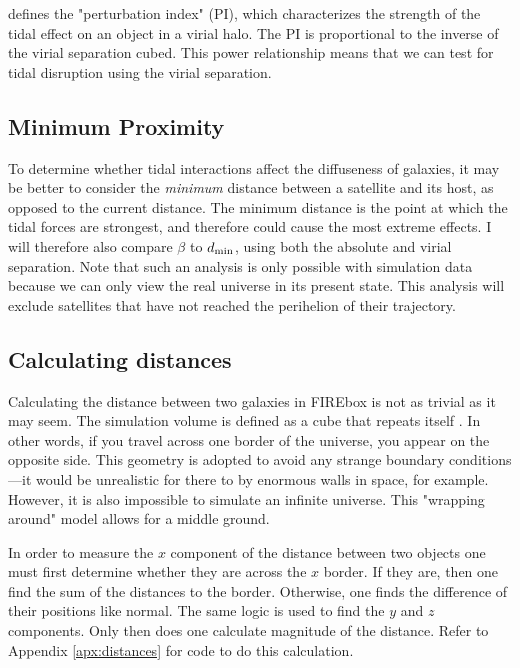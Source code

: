 \cite{jacksonDarkmatterdeficientDwarfGalaxies2021} defines the "perturbation index" (PI), which characterizes the strength of the tidal effect on an object in a virial halo. The PI is proportional to the inverse of the virial separation cubed. This power relationship means that we can test for tidal disruption using the virial separation.

 \subsection{Minimum Proximity}

 To determine whether tidal interactions affect the diffuseness of galaxies, it may be better to consider the \emph{minimum} distance between a satellite and its host, as opposed to the current distance. The minimum distance is the point at which the tidal forces are strongest, and therefore could cause the most extreme effects. I will therefore also compare $\beta$ to $d_{\rm{min}}$, using both the absolute and virial separation. Note that such an analysis is only possible with simulation data because we can only view the real universe in its present state. This analysis will exclude satellites that have not reached the perihelion of their trajectory.

\subsection{Calculating distances}

Calculating the distance between two galaxies in FIREbox is not as trivial as it may seem. The simulation volume is defined as a cube that repeats itself \citep{feldmannFIREboxSimulatingGalaxies2022}. In other words, if you travel across one border of the universe, you appear on the opposite side. This geometry is adopted to avoid any strange boundary conditions---it would be unrealistic for there to by enormous walls in space, for example. However, it is also impossible to simulate an infinite universe. This "wrapping around" model allows for a middle ground.

In order to measure the $x$ component of the distance between two objects one must first determine whether they are across the $x$ border. If they are, then one find the sum of the distances to the border. Otherwise, one finds the difference of their positions like normal. The same logic is used to find the $y$ and $z$ components. Only then does one calculate magnitude of the distance. Refer to Appendix \ref{apx:distances} for code to do this calculation.


